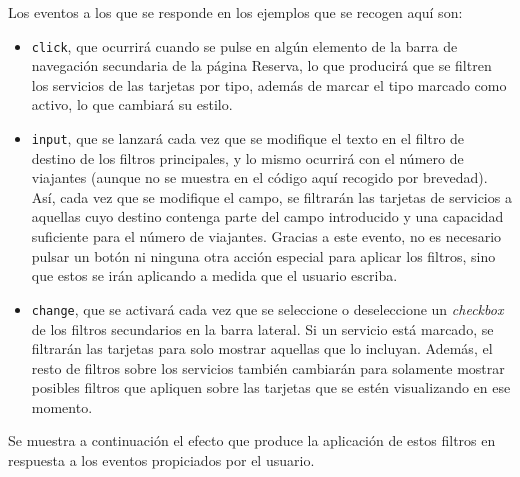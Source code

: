 \documentclass[11pt, a4paper]{book}
\begin{document}
    Los eventos a los que se responde en los ejemplos que se recogen aquí son:
    \begin{itemize}
        \item \texttt{click}, que ocurrirá cuando se pulse en algún elemento de la barra de navegación secundaria de la página Reserva, lo que producirá que se filtren los servicios de las tarjetas por tipo, además de marcar el tipo marcado como activo, lo que cambiará su estilo. 
        \item \texttt{input}, que se lanzará cada vez que se modifique el texto en el filtro de destino de los filtros principales, y lo mismo ocurrirá con el número de viajantes (aunque no se muestra en el código aquí recogido por brevedad). Así, cada vez que se modifique el campo, se filtrarán las tarjetas de servicios a aquellas cuyo destino contenga parte del campo introducido y una capacidad suficiente para el número de viajantes. Gracias a este evento, no es necesario pulsar un botón ni ninguna otra acción especial para aplicar los filtros, sino que estos se irán aplicando a medida que el usuario escriba.
        \item \texttt{change}, que se activará cada vez que se seleccione o deseleccione un \textit{checkbox} de los filtros secundarios en la barra lateral. Si un servicio está marcado, se filtrarán las tarjetas para solo mostrar aquellas que lo incluyan. Además, el resto de filtros sobre los servicios también cambiarán para solamente mostrar posibles filtros que apliquen sobre las tarjetas que se estén visualizando en ese momento.
    \end{itemize}

    Se muestra a continuación el efecto que produce la aplicación de estos filtros en respuesta a los eventos propiciados por el usuario.
    
    \newpage
\end{document}
